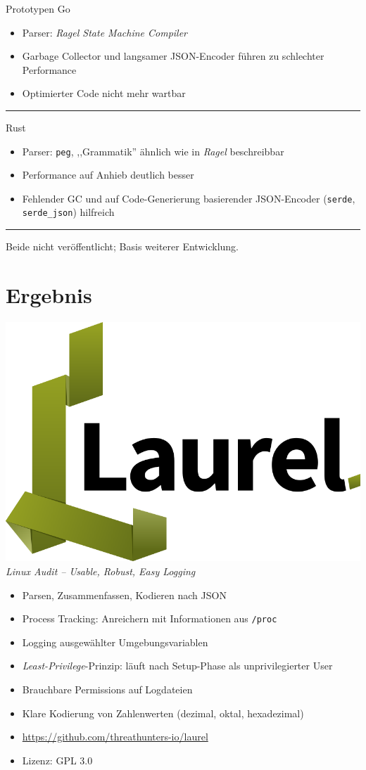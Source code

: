 \documentclass[xcolor={dvipsnames},aspectratio=169]{beamer}
\begin{document}
\begin{frame}{Prototypen}
  Go
  \begin{itemize}
  \item Parser: \emph{Ragel State Machine Compiler}
  \item Garbage Collector und langsamer JSON-Encoder führen zu schlechter Performance
  \item Optimierter Code nicht mehr wartbar
  \end{itemize}
  \vspace{1ex}
  \hrule
  \vspace{1ex}
    Rust
  \begin{itemize}
  \item Parser: \texttt{peg}, ,,Grammatik'' ähnlich wie in \emph{Ragel} beschreibbar
  \item Performance auf Anhieb deutlich besser
  \item Fehlender GC und auf Code-Generierung basierender JSON-Encoder (\texttt{serde}, \texttt{serde\_json}) hilfreich
  \end{itemize}
  \vspace{1ex}
  \hrule
  \vspace{1ex}
  Beide nicht veröffentlicht; Basis weiterer Entwicklung.
\end{frame}

\section{Ergebnis}

\begin{frame}
  {\centering
    \includegraphics[height=10ex]{images/laurel.png}\\
    \small \vspace{-1ex} \emph{Linux Audit -- Usable, Robust, Easy Logging}
  }
  \begin{itemize}
  \item Parsen, Zusammenfassen, Kodieren nach JSON
  \item Process Tracking: Anreichern mit Informationen aus \texttt{/proc}
  \item Logging ausgewählter Umgebungsvariablen
  \item \emph{Least-Privilege}-Prinzip: läuft nach Setup-Phase als unprivilegierter User
  \item Brauchbare Permissions auf Logdateien
  \item Klare Kodierung von Zahlenwerten (dezimal, oktal, hexadezimal)
  \item \url{https://github.com/threathunters-io/laurel}
  \item Lizenz: GPL 3.0
  \end{itemize}
\end{frame}
\end{document}
